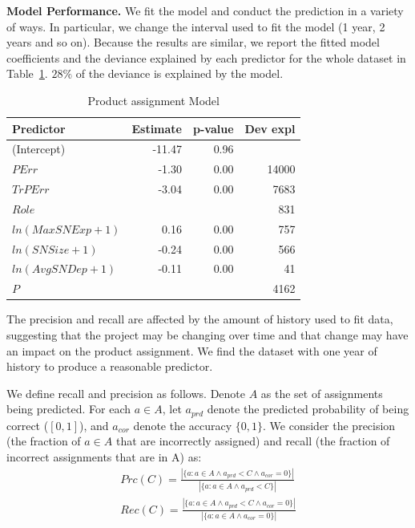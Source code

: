 \documentclass{sig-alternate}
\begin{document}
{\bf Model Performance.} We fit the model and conduct the prediction
in a variety of ways.  In particular,
we change the interval used to fit the model (1 year, 2 years and so
on).  Because the results are similar, we report the
fitted model coefficients and the deviance explained by each
predictor for the whole dataset in Table~\ref{tab:model}. $28\%$ of
the deviance is explained by the model.

\begin{table}
\vspace{-.1cm}
\centering
\caption{Product assignment Model}\label{tab:model}
\begin{tabular}{l|r|r|r}\hline
Predictor             & Estimate & p-value & Dev expl \\ \hline
  (Intercept) & -11.47 & 0.96 &  \\
  $PErr$ & -1.30 & 0.00 & 14000 \\
  $TrPErr$ & -3.04 & 0.00 & 7683 \\   \hline
  $Role$ & & & 831 \\
  $ln(MaxSNExp + 1)$ & 0.16 & 0.00 & 757 \\
  $ln(SNSize + 1)$ & -0.24 & 0.00 & 566 \\
  $ln(AvgSNDep + 1)$ & -0.11 & 0.00 & 41 \\   \hline
  $P$ &  &  & 4162 \\
  \hline
\end{tabular}
\vspace{-.2cm}
\end{table}

The precision and recall are affected by the amount of history
used to fit data, suggesting that the project may be changing
over time and that change may have an impact on the product
assignment.  We find the dataset with one year of history to produce
a reasonable predictor.

We define recall and precision as follows.
Denote $A$ as the set of assignments being predicted. For
each $a \in A$, let $a_{prd}$ denote the predicted probability of
being correct ($[0,1]$), and $a_{cor}$ denote the accuracy $\{0,1\}$.
We consider the precision (the fraction of
$a\in A$ that are incorrectly assigned) and recall (the fraction of
incorrect assignments that are in A) as:
\begin{align}
Prc(C) = \frac{|\{a: a \in A \land a_{prd} < C \land
  a_{cor} = 0\}|}{|\{a: a \in A \land a_{prd} < C\}|} \nonumber\\
Rec(C) = \frac{|\{a: a \in A \land a_{prd} < C \land a_{cor}
  = 0\}|}{|\{a: a \in A \land a_{cor} = 0\}|}\nonumber
\end{align}
\end{document}
